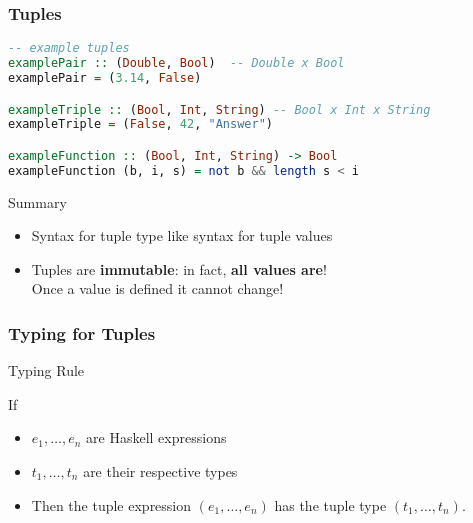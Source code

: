 \documentclass{beamer}
\begin{document}
\begin{frame}[fragile]
  \frametitle{Tuples}
  \begin{block}{}
\begin{lstlisting}[language=Haskell]
-- example tuples
examplePair :: (Double, Bool)  -- Double x Bool
examplePair = (3.14, False)

exampleTriple :: (Bool, Int, String) -- Bool x Int x String
exampleTriple = (False, 42, "Answer")

exampleFunction :: (Bool, Int, String) -> Bool
exampleFunction (b, i, s) = not b && length s < i
\end{lstlisting}
  \end{block}
  \begin{alertblock}{Summary}
    \begin{itemize}
    \item Syntax for tuple type like syntax for tuple values
    \item Tuples are \textbf{immutable}: in fact, \textbf{all values
        are}!\\
      Once a value is defined it cannot change! 
    \end{itemize}
  \end{alertblock}
\end{frame}

\begin{frame}
  \frametitle{Typing for Tuples}
  \begin{block}{Typing Rule}
    \begin{mathpar}
    \end{mathpar}
    If
    \begin{itemize}
    \item $e_1, \dots, e_n$ are Haskell expressions
    \item $t_1, \dots, t_n$ are their respective types
    \item Then the tuple expression $(e_1, \dots, e_n)$ has the tuple
      type $(t_1, \dots, t_n)$.
    \end{itemize}
  \end{block}
\end{frame}
\end{document}
